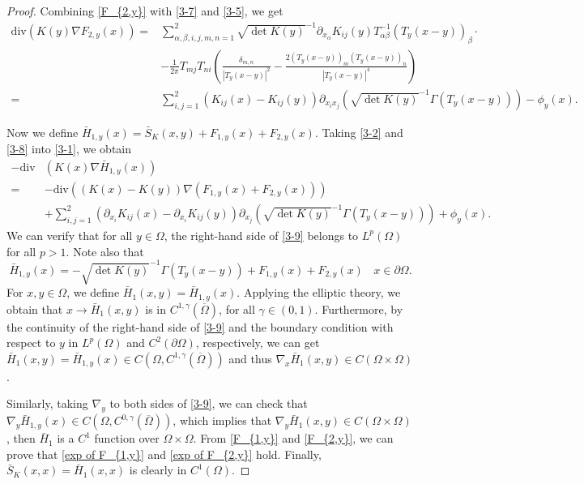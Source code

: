 \documentclass[12pt,reqno]{amsart}
\numberwithin{equation}{section}
\theoremstyle{definition}
\theoremstyle{remark}
\begin{document}
\begin{proof}
	Combining \eqref{F_{2,y}} with \eqref{3-7} and \eqref{3-5}, we get
	\begin{equation}\label{3-8}
	\begin{split}
	\text{div}\left(K(y) \nabla F_{2,y}(x)  \right)=&\sum_{\alpha,\beta,i,j,m,n=1}^2\sqrt{\det K(y)}^{-1}\partial_{x_\alpha}K_{ij}(y)T^{-1}_{\alpha\beta} \left (T_y(x-y)\right )_\beta\cdot \\
	&-\frac{1}{2\pi}T_{mj}T_{ni}\left(\frac{\delta_{m,n}}{|T_y(x-y)|^2}-\frac{2\left( T_y(x-y)\right)_m\left( T_y(x-y)\right)_n}{|T_y(x-y)|^4} \right)\\
	=&
	\sum_{i,j=1}^2\left( K_{ij}(x)-K_{ij}(y)\right) \partial_{x_ix_j}\left(\sqrt{\det K(y)}^{-1}\Gamma\left (T_y(x-y)\right ) \right)-\phi_y(x).
	\end{split}
	\end{equation}
	
	Now we define $ \bar{H}_{1,y}(x)=\bar{S}_K(x,y)+F_{1,y}(x)+F_{2,y}(x) $. Taking \eqref{3-2} and \eqref{3-8} into \eqref{3-1}, we obtain
	\begin{equation}\label{3-9}
	\begin{split}
	-\text{div}&\left (K(x)\nabla \bar{H}_{1,y}(x)\right )\\
	=&-\text{div}\left (\left( K(x)-K(y)\right) \nabla\left( F_{1,y}(x)+F_{2,y}(x)\right) \right) \\
	&+\sum_{i,j=1}^2\left( \partial_{x_i}K_{ij}(x)-\partial_{x_i}K_{ij}(y)\right) \partial_{x_j}\left(\sqrt{\det K(y)}^{-1}\Gamma\left (T_y(x-y)\right ) \right)+\phi_y(x).
	\end{split}
	\end{equation}
	We can verify that for all $ y\in\Omega $, the right-hand side of \eqref{3-9} belongs to $ L^p(\Omega) $ for all $ p>1. $ Note also that
	\begin{equation*}
	\bar{H}_{1,y}(x)=-\sqrt{\det K(y)}^{-1}\Gamma\left (T_y(x-y)\right )+F_{1,y}(x)+F_{2,y}(x)\ \ \ \ x\in\partial\Omega.
	\end{equation*}
	For $ x,y\in\Omega $, we define $ \bar{H}_1(x,y)=\bar{H}_{1,y}(x) $. Applying the elliptic theory, we obtain that $ x\to \bar{H}_1(x,y) $ is in $ C^{1,\gamma}(\overline{\Omega}) $, for all $ \gamma\in(0,1) $. Furthermore,
	by the continuity of the right-hand side of \eqref{3-9} and the boundary condition with respect to $ y $ in $ L^p(\Omega) $   and $ C^2(\partial\Omega) $, respectively, we can get $ \bar{H}_1(x,y)=\bar{H}_{1,y}(x)\in C(\Omega, C^{1,\gamma}(\overline{\Omega})) $ and thus $ \nabla_x\bar{H}_1(x,y)\in C(\Omega\times \Omega) $.
	
	Similarly,  taking $ \nabla_y $ to both sides of \eqref{3-9}, we can check that $ \nabla_y\bar{H}_{1,y}(x)\in C(\Omega, C^{0,\gamma}(\overline{\Omega})) $, which implies that $ \nabla_y\bar{H}_1(x,y)\in C(\Omega\times \Omega) $, then $ \bar{H}_1 $ is a $ C^1 $ function over $ \Omega\times \Omega $. From \eqref{F_{1,y}} and \eqref{F_{2,y}}, we can prove that \eqref{exp of F_{1,y}} and \eqref{exp of F_{2,y}} hold. Finally, $ \bar{S}_K(x, x) =  \bar{H}_1(x,x) $ is clearly in $ C^1(\Omega) $.
	
\end{proof}
\end{document}
